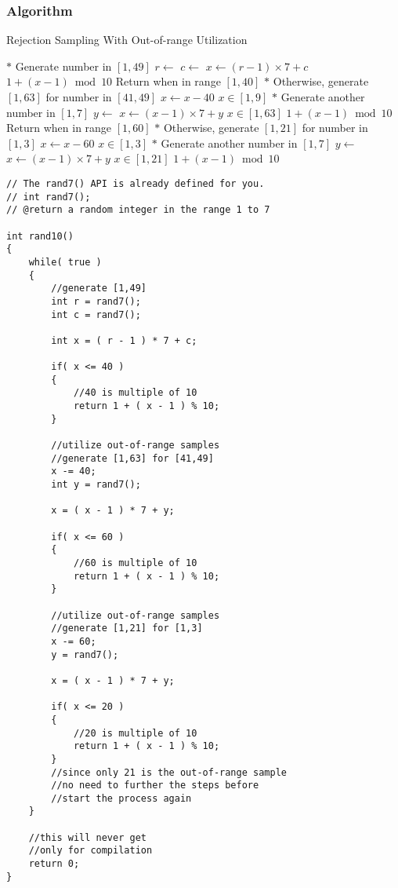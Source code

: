 \subsubsection{Algorithm}
\begin{algorithm}[H]
\caption{Rejection Sampling With Out-of-range Utilization}
\begin{algorithmic}[1]
\Loop
\State $\ast$ Generate number in $[1,49]$
\State $r \gets $ 
\State $c \gets $ 
\State $x \gets (r-1)\times 7 + c$
\State \Return $1+(x-1)\bmod 10$ \Comment Return when in range $[1,40]$
\EndIf
\State $\ast$ Otherwise, generate $[1,63]$ for number in $[41,49]$
\State $x\gets x - 40$ \Comment $x\in[1,9]$
\State $\ast$ Generate another number in $[1,7]$
\State $y \gets $ 
\State $x \gets (x-1)\times 7 + y$  \Comment $x\in [1, 63]$
\State \Return $1+(x-1)\bmod 10$ \Comment Return when in range $[1,60]$
\EndIf
\State $\ast$ Otherwise, generate $[1,21]$ for number in $[1,3]$
\State $x\gets x - 60$ \Comment $x \in [1,3]$
\State $\ast$ Generate another number in $[1,7]$
\State $y \gets $ 
\State $x \gets (x-1)\times 7 + y$  \Comment $x\in [1, 21]$
\State \Return $1+(x-1)\bmod 10$
\EndIf
\EndLoop
\EndProcedure
\end{algorithmic}
\end{algorithm}

\setcounter{lstlisting}{0}
\begin{lstlisting}[style=customc, caption={Out-of-range Utilization}]
// The rand7() API is already defined for you.
// int rand7();
// @return a random integer in the range 1 to 7

int rand10()
{
    while( true )
    {
        //generate [1,49]
        int r = rand7();
        int c = rand7();

        int x = ( r - 1 ) * 7 + c;

        if( x <= 40 )
        {
            //40 is multiple of 10
            return 1 + ( x - 1 ) % 10;
        }

        //utilize out-of-range samples
        //generate [1,63] for [41,49]
        x -= 40;
        int y = rand7();

        x = ( x - 1 ) * 7 + y;

        if( x <= 60 )
        {
            //60 is multiple of 10
            return 1 + ( x - 1 ) % 10;
        }

        //utilize out-of-range samples
        //generate [1,21] for [1,3]
        x -= 60;
        y = rand7();

        x = ( x - 1 ) * 7 + y;

        if( x <= 20 )
        {
            //20 is multiple of 10
            return 1 + ( x - 1 ) % 10;
        }
        //since only 21 is the out-of-range sample
        //no need to further the steps before
        //start the process again
    }

    //this will never get
    //only for compilation
    return 0;
}

\end{lstlisting}
